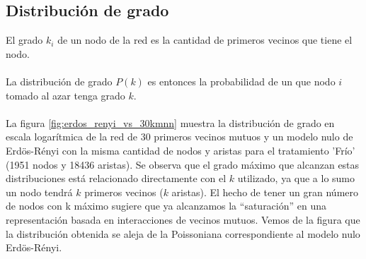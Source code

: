 \subsection*{Distribución de grado}
El grado $k_i$ de un nodo de la red es la cantidad de primeros vecinos que tiene el nodo.\\\\
La distribución de grado $P(k)$ es entonces la probabilidad de un que nodo $i$ tomado al azar tenga grado $k$.\\\\La figura \ref{fig:erdos_renyi_vs_30kmnn} muestra la distribución de grado en escala logarítmica de la red de 30 primeros vecinos mutuos y un modelo nulo de Erdös-Rényi con la misma cantidad de nodos y aristas para el tratamiento 'Frío' (1951 nodos y 18436 aristas). Se observa que el grado máximo que alcanzan estas distribuciones está relacionado directamente con el $k$ utilizado, ya que a lo sumo un nodo tendrá $k$ primeros vecinos ($k$ aristas). El hecho de tener un gran número de nodos con k máximo sugiere que ya alcanzamos la ``saturación'' en una representación basada en interacciones de vecinos mutuos. Vemos de la figura que la distribución obtenida se aleja de la Poissoniana correspondiente al modelo nulo Erdös-Rényi.
